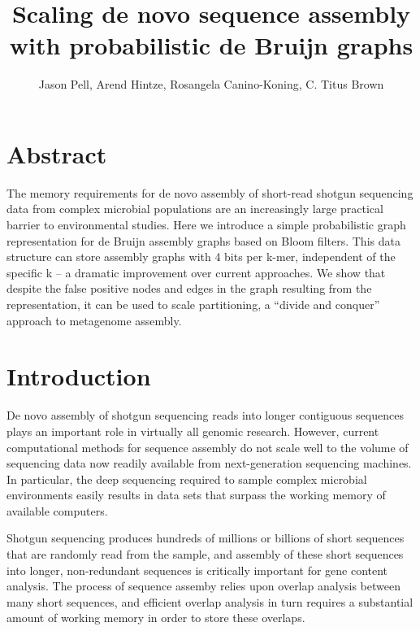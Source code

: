 \documentclass[12pt]{article} \usepackage{simplemargins}
\begin{document}
\title{Scaling de novo sequence assembly with probabilistic de Bruijn graphs}
\author{Jason Pell, Arend Hintze, Rosangela Canino-Koning, C. Titus Brown}

\maketitle

\section{Abstract}

The memory requirements for de novo assembly of short-read shotgun
sequencing data from complex microbial populations are an increasingly
large practical barrier to environmental studies.  Here we introduce a
simple probabilistic graph representation for de Bruijn assembly
graphs based on Bloom filters.  This data structure can store assembly
graphs with 4 bits per k-mer, independent of the specific k -- a
dramatic improvement over current approaches.  We show that despite
the false positive nodes and edges in the graph resulting from the
representation, it can be used to scale partitioning, a ``divide and
conquer'' approach to metagenome assembly.

\section{Introduction}

De novo assembly of shotgun sequencing reads into longer contiguous
sequences plays an important role in virtually all genomic research.
However, current computational methods for sequence assembly do not
scale well to the volume of sequencing data now readily available from
next-generation sequencing machines.  In particular, the deep
sequencing required to sample complex microbial environments easily
results in data sets that surpass the working memory of available
computers.

Shotgun sequencing produces hundreds of millions or billions of short
sequences that are randomly read from the sample, and assembly of
these short sequences into longer, non-redundant sequences is
critically important for gene content analysis.  The process of
sequence assemby relies upon overlap analysis between many short
sequences, and efficient overlap analysis in turn requires a
substantial amount of working memory in order to store these overlaps.
\end{document}
